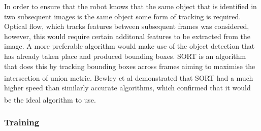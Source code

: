\documentclass[11pt]{article}		%
\newcommand{\supercite}[1]{\textsuperscript{\cite{#1}}}		%
\newcommand{\figref}[1]{\hyperref[#1]{Figure \ref*{#1}}}    %
\begin{document}
	        In order to ensure that the robot knows that the same object that is identified in two subsequent images is the same object some form of tracking is required. Optical flow, which tracks features between subsequent frames was considered, however, this would require certain additonal features to be extracted from the image. A more preferable algorithm would make use of the object detection that has already taken place and produced bounding boxes. SORT is an algorithm that does this by tracking bounding boxes across frames aiming to maximise the intersection of union metric. Bewley et al \supercite{object_tracking} demonstrated that SORT had a much higher speed than similarly accurate algorithms, which confirmed that it would be the ideal algorithm to use.\supercite{object_tracking} 
	        
			
        \subsubsection{Training}
        
\end{document}
